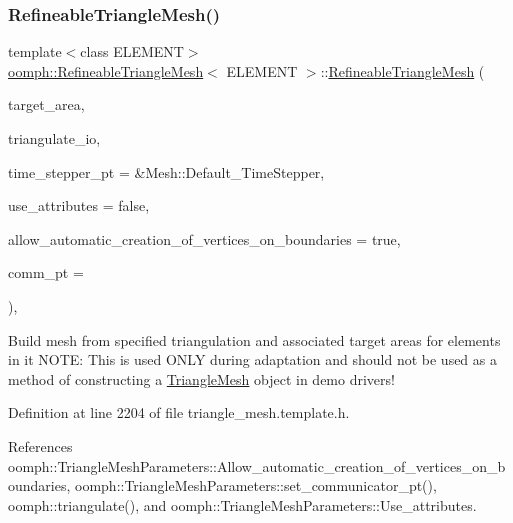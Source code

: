 \subsubsection{\texorpdfstring{Refineable\+Triangle\+Mesh()}{RefineableTriangleMesh()}\hspace{0.1cm}{\footnotesize\ttfamily [3/3]}}
{\footnotesize\ttfamily template$<$class E\+L\+E\+M\+E\+NT$>$ \\
\hyperlink{classoomph_1_1RefineableTriangleMesh}{oomph\+::\+Refineable\+Triangle\+Mesh}$<$ E\+L\+E\+M\+E\+NT $>$\+::\hyperlink{classoomph_1_1RefineableTriangleMesh}{Refineable\+Triangle\+Mesh} (\begin{DoxyParamCaption}\item[{const Vector$<$ double $>$ \&}]{target\+\_\+area,  }\item[{Triangulate\+IO \&}]{triangulate\+\_\+io,  }\item[{Time\+Stepper $\ast$}]{time\+\_\+stepper\+\_\+pt = {\ttfamily \&Mesh\+:\+:Default\+\_\+TimeStepper},  }\item[{const bool \&}]{use\+\_\+attributes = {\ttfamily false},  }\item[{const bool \&}]{allow\+\_\+automatic\+\_\+creation\+\_\+of\+\_\+vertices\+\_\+on\+\_\+boundaries = {\ttfamily true},  }\item[{Oomph\+Communicator $\ast$}]{comm\+\_\+pt = {} }\end{DoxyParamCaption})\hspace{0.3cm}{\ttfamily [inline]}, {\ttfamily [protected]}}



Build mesh from specified triangulation and associated target areas for elements in it N\+O\+TE\+: This is used O\+N\+LY during adaptation and should not be used as a method of constructing a \hyperlink{classoomph_1_1TriangleMesh}{Triangle\+Mesh} object in demo drivers! 



Definition at line 2204 of file triangle\+\_\+mesh.\+template.\+h.



References oomph\+::\+Triangle\+Mesh\+Parameters\+::\+Allow\+\_\+automatic\+\_\+creation\+\_\+of\+\_\+vertices\+\_\+on\+\_\+boundaries, oomph\+::\+Triangle\+Mesh\+Parameters\+::set\+\_\+communicator\+\_\+pt(), oomph\+::triangulate(), and oomph\+::\+Triangle\+Mesh\+Parameters\+::\+Use\+\_\+attributes.

\mbox{\label{classoomph_1_1RefineableTriangleMesh_a1b8b8e3142e215013533c6ee14c5484e}} 
